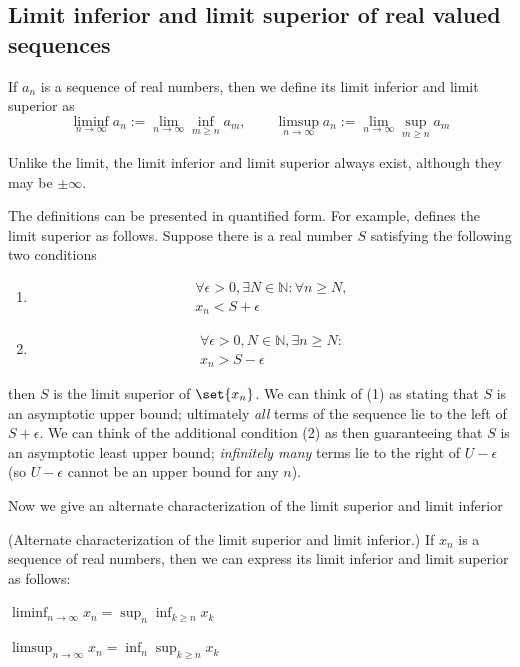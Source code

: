 \documentclass{article} %
\begin{document}
\subsection{Limit inferior and limit superior of real valued sequences}

\begin{definition}
If $a_n$ is a sequence of real numbers, then  we define its limit inferior and limit superior as 
\[ \liminf_{n \to \infty} a_n := \lim_{n \to \infty} \inf_{m \geq n} a_m, \quad \quad \limsup_{n \to \infty} a_n := \lim_{n \to \infty} \sup_{m \geq n} a_m \]	
\end{definition}

Unlike the limit, the limit inferior and limit superior always exist, although they may be $\pm \infty$.

\begin{remark}{}
The definitions can be presented in quantified form.  For example, \cite{apostol1974mathematical} defines the limit superior as follows. Suppose there is a real number $S$ satisfying the following two conditions
\begin{enumerate}
\item \begin{align*}
 \forall \epsilon > 0, \exists N \in \mathbb{N}: \forall n \geq N,\\
 x_n < S + \epsilon 	
 \end{align*}

\item \begin{align*}
 \forall \epsilon > 0, N \in \mathbb{N}, \exists n \geq N : \\
 x_n > S - \epsilon 	
 \end{align*}
\end{enumerate}
then $S$ is the limit superior of $\set{x_n}$.  We can think of (1) as stating that $S$ is an asymptotic upper bound;  ultimately \textit{all} terms of the sequence lie to the left of $S + \epsilon$.  We can think of the additional condition (2) as then guaranteeing that $S$ is an asymptotic least upper bound; \textit{infinitely many} terms lie to the right of $U - \epsilon$ (so $U - \epsilon$ cannot be an upper bound for any $n$). 
\end{remark}

Now we give an alternate characterization of the limit superior and limit inferior

\begin{proposition}{\textnormal{(Alternate characterization of the limit superior and limit inferior.)}} If $x_n$ is a sequence of real numbers, then we can express its limit inferior and limit superior as follows:
\begin{alphabate}
	
\item $\liminf_{n \to \infty} x_n = \sup_n \inf_{k \geq n} x_k$
\item $\limsup_{n \to \infty} x_n = \inf_n \sup_{k \geq n} x_k$ 
\end{alphabate}
\label{prop:alt_characterization_liminf_and_limsup}
\end{proposition}
\end{document}
